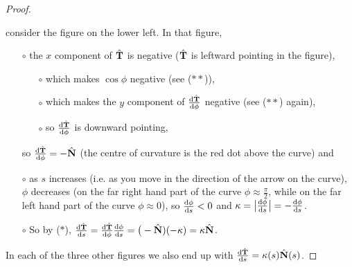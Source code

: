 \begin{proof}
{\begin{efig}
\begin{center}
\end{center}
\end{efig}
}
consider the figure on the lower left. In that figure,
\begin{itemize}\itemsep1pt \parskip0pt  %
\item[$\circ$] 
the $x$ component of $\hat{\mathbf{T}}$ is negative ($\hat{\mathbf{T}}$ is leftward pointing in the figure),
\begin{itemize}\itemsep1pt \parskip0pt  %
\item[$\circ$] 
which makes $\cos\phi$ negative (see ($**$)), 
\item[$\circ$] 
which makes the $y$ component of $\diff{\hat\vT}{\phi}$ negative
            (see ($**$) again),
\item[$\circ$] 
so $\diff{\hat\vT}{\phi}$ is downward pointing,
\end{itemize}
so $\diff{\hat\vT}{\phi}=-\hat\vN$ (the centre of curvature is the red dot 
above the curve) and
\item[$\circ$] as $s$ increases (i.e. as you move in the direction of the
arrow on the curve), $\phi$ decreases (on the far right hand part of the curve $\phi\approx\frac{\pi}{2}$, while on the far left hand part of the curve $\phi\approx 0$), so $\diff{\phi}{s}<0$ and
$\ka = \big|\diff{\phi}{s}\big| = - \diff{\phi}{s}$.
\item[$\circ$] So by ($*$),
$\diff{\hat\vT}{s} = \diff{\hat\vT}{\phi} \diff{\phi}{s}
=\big(-\hat\vN)(-\ka) = \ka\hat\vN$.
\end{itemize}
In each of the three other figures we also end up with 
$\diff{\hat\vT}{s} = \ka(s)\hat\vN(s)$.
\end{proof}
